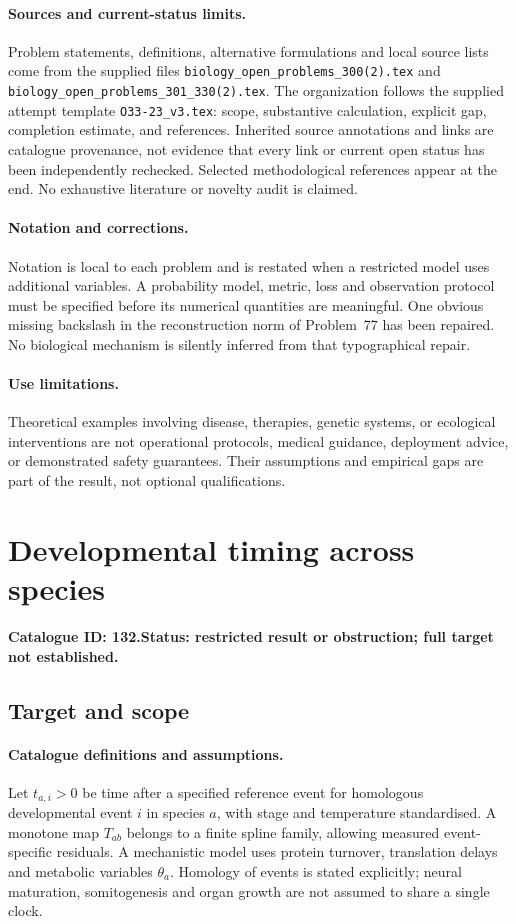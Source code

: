 \documentclass[11pt]{article}
\begin{document}
\paragraph{Sources and current-status limits.}
Problem statements, definitions, alternative formulations and local source lists
come from the supplied files
\texttt{biology\_open\_problems\_300(2).tex} and
\texttt{biology\_open\_problems\_301\_330(2).tex}.
The organization follows the supplied attempt template
\texttt{O33-23\_v3.tex}: scope, substantive calculation, explicit gap,
completion estimate, and references. Inherited source annotations and links are
catalogue provenance, not evidence that every link or current open status has
been independently rechecked. Selected methodological references appear at the
end. No exhaustive literature or novelty audit is claimed.

\paragraph{Notation and corrections.}
Notation is local to each problem and is restated when a restricted model uses
additional variables. A probability model, metric, loss and observation protocol
must be specified before its numerical quantities are meaningful. One obvious
missing backslash in the reconstruction norm of Problem~77 has been repaired.
No biological mechanism is silently inferred from that typographical repair.

\paragraph{Use limitations.}
Theoretical examples involving disease, therapies, genetic systems, or ecological
interventions are not operational protocols, medical guidance, deployment advice,
or demonstrated safety guarantees. Their assumptions and empirical gaps are part
of the result, not optional qualifications.

\setcounter{section}{131}
\section{Developmental timing across species}
\label{prob:132}
\noindent\textbf{Catalogue ID: 132.}\quad \textbf{Status: restricted result or obstruction; full target not established.}
\subsection{Target and scope}
\paragraph{Catalogue definitions and assumptions.}
Let $t_{a,i}>0$ be time after a specified reference event for homologous developmental event $i$ in species $a$, with stage and temperature standardised. A monotone map $T_{ab}$ belongs to a finite spline family, allowing measured event-specific residuals. A mechanistic model uses protein turnover, translation delays and metabolic variables $\theta_a$. Homology of events is stated explicitly; neural maturation, somitogenesis and organ growth are not assumed to share a single clock.
\end{document}
